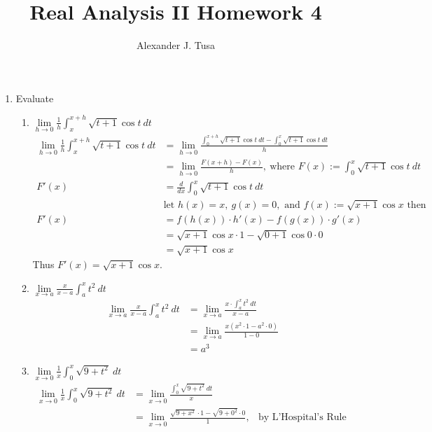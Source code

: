 \documentclass[12pt,letterpaper]{article}
\author{Alexander J. Tusa}
\title{Real Analysis II Homework 4}
\newcommand{\limx}[2]{\displaystyle\lim\limits_{#1 \to #2}}
\theoremstyle{case}
\theoremstyle{definition}
\begin{document}
	\maketitle
	\begin{enumerate}
		\item Evaluate
		\begin{enumerate}
			\item $\displaystyle\lim\limits_{h \to 0} \frac{1}{h} \int_{x}^{x+h} \sqrt{t+1}\cos t\ dt$ \\
			\begin{align*}
				\limx{h}{0}\frac{1}{h} \int_{x}^{x+h} \sqrt{t+1}\cos t\ dt &= \limx{h}{0} \frac{\displaystyle\int_{0}^{x+h}\sqrt{t+1} \cos t\ dt - \int_{0}^{x} \sqrt{t+1}\cos t\ dt}{h} \\
				&=\limx{h}{0} \frac{F(x+h)-F(x)}{h},\  \text{where $F(x):=\int_{0}^{x}\sqrt{t+1}\cos t\ dt$} \\
				F'(x) &= \frac{d}{dx} \int_{0}^{x} \sqrt{t+1}\cos t\ dt \\
				&\text{let } h(x)=x,\ g(x)=0,\text{ and } f(x):=\sqrt{x+1}\cos x\text{ then} \\
				F'(x) &= f(h(x))\cdot h'(x) - f(g(x))\cdot g'(x) \\
				&= \sqrt{x+1}\cos x \cdot 1 -\sqrt{0+1}\cos 0 \cdot 0 \\
				&= \sqrt{x+1}\cos x		
			\end{align*}
			Thus $F'(x)=\sqrt{x+1}\cos x$.\\
			\item $\displaystyle\lim\limits_{x \to a} \frac{x}{x-a} \int_{a}^{x} t^2\ dt$ \\
			\begin{align*}
				\limx{x}{a} \frac{x}{x-a} \int_{a}^{x} t^2\ dt &= \limx{x}{a} \frac{x \cdot \displaystyle\int_{a}^{x} t^2\ dt}{x-a} \\
				&= \lim\limits_{x \to a} \frac{x(x^2\cdot 1 -a^2\cdot 0)}{1-0} \\
				&= a^3
			\end{align*}
			\item $\displaystyle\lim\limits_{x \to 0} \frac{1}{x} \int_{0}^{x} \sqrt{9 + t^2}\ dt$
			\begin{align*}
				\limx{x}{0} \frac{1}{x} \int_{0}^{x} \sqrt{9+t^2}\ dt &= \limx{x}{0} \frac{\displaystyle\int_{0}^{x} \sqrt{9+t^2}\ dt}{x} \\
				&= \limx{x}{0} \frac{\sqrt{9+x^2}\cdot 1 - \sqrt{9+0^2}\cdot 0}{1}, &\text{by L'Hospital's Rule and Leibniz's Rule} \\

\end{align*}
\end{enumerate}
\end{enumerate}
\end{document}
